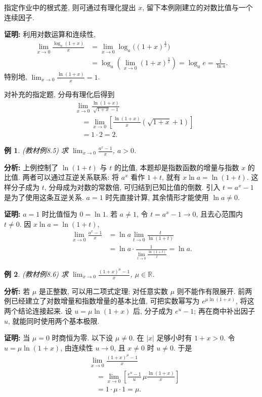\documentclass[UTF8,openany]{ctexbook}
\theoremstyle{chinesetextbook}
\newtheorem{example}{例}[section]
\newenvironment{cnproof}{\par\indent\textbf{证明:} \ignorespaces}{\par}
\begin{document}
指定作业中的根式差, 则可通过有理化提出 $x$, 留下本例刚建立的对数比值与一个连续因子.
\begin{cnproof}
利用对数运算和连续性,
\[
\begin{aligned}
\lim_{x\to0}\frac{\log_a(1+x)}x
&=\lim_{x\to0}\log_a\bigl((1+x)^{\frac1x}\bigr)\\
&=\log_a\left(\lim_{x\to0}(1+x)^{\frac1x}\right)
=\log_a e=\frac1{\ln a}.
\end{aligned}
\]
特别地, $\displaystyle \lim_{x\to0}\frac{\ln(1+x)}x=1$.

对补充的指定题, 分母有理化后得到
\[
\begin{aligned}
&\lim_{x\to0}\frac{\ln(1+x)}{\sqrt{1+x}-1}\\
&\quad=\lim_{x\to0}\left[\frac{\ln(1+x)}x(\sqrt{1+x}+1)\right]\\
&\quad=1\cdot2=2.
\end{aligned}
\]

\end{cnproof}
\begin{example}
(教材例8.5) 求 $\displaystyle \lim_{x\to0}\frac{a^x-1}x$, $a>0$.
\end{example}
\par\indent\textbf{分析:} 上例控制了 $\ln(1+t)$ 与 $t$ 的比值, 本题却是指数函数的增量与指数 $x$ 的比值. 两者可以通过互逆关系联系: 将 $a^x$ 看作 $1+t$, 就有 $x\ln a=\ln(1+t)$. 这样分子成为 $t$, 分母成为对数的常数倍, 可归结到已知比值的倒数. 引入 $t=a^x-1$ 是为了使用这条互逆关系. $a=1$ 时先直接计算, 其余情形才能使用 $\ln a\ne0$.
\begin{cnproof}
$a=1$ 时比值恒为 $0=\ln1$. 若 $a\ne1$, 令 $t=a^x-1\to0$, 且去心范围内 $t\ne0$. 因 $x\ln a=\ln(1+t)$,
\[
\begin{aligned}
\lim_{x\to0}\frac{a^x-1}x
&=\ln a\lim_{t\to0}\frac t{\ln(1+t)}\\
&=\ln a\cdot\frac1{\displaystyle\lim_{t\to0}\frac{\ln(1+t)}t}=\ln a.
\end{aligned}
\]
\end{cnproof}
\begin{example}
(教材例8.6) 求 $\displaystyle \lim_{x\to0}\frac{(1+x)^\mu-1}x$, $\mu\in\mathbb R$.
\end{example}
\par\indent\textbf{分析:} 若 $\mu$ 是正整数, 可以用二项式定理; 对任意实数 $\mu$ 则不能作有限展开. 前两例已经建立了对数增量和指数增量的基本比值, 可把实数幂写为 $e^{\mu\ln(1+x)}$, 将这两个结论连接起来. 设 $u=\mu\ln(1+x)$ 后, 分子成为 $e^u-1$; 再在商中补出因子 $u$, 就能同时使用两个基本极限.
\begin{cnproof}
当 $\mu=0$ 时商恒为零. 以下设 $\mu\ne0$. 在 $|x|$ 足够小时有 $1+x>0$. 令 $u=\mu\ln(1+x)$, 由连续性 $u\to0$, 且 $x\ne0$ 时 $u\ne0$. 于是
\[
\begin{aligned}
&\lim_{x\to0}\frac{(1+x)^\mu-1}x\\
&\quad=\lim_{x\to0}\left[\frac{e^u-1}u\,\mu\frac{\ln(1+x)}x\right]\\
&\quad=1\cdot\mu\cdot1=\mu.
\end{aligned}
\]
\end{cnproof}
\end{document}
